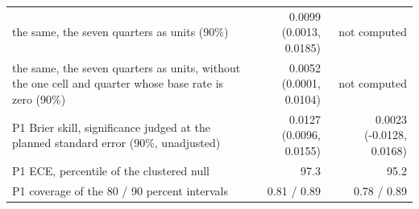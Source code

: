 \begin{tabular}{lrr}
the same, the seven quarters as units (90\%) & 0.0099 (0.0013, 0.0185) & not computed \\
the same, the seven quarters as units, without the one cell and quarter whose base rate is zero (90\%) & 0.0052 (0.0001, 0.0104) & not computed \\
P1 Brier skill, significance judged at the planned standard error (90\%, unadjusted) & 0.0127 (0.0096, 0.0155) & 0.0023 (-0.0128, 0.0168) \\
P1 ECE, percentile of the clustered null & 97.3 & 95.2 \\
P1 coverage of the 80 / 90 percent intervals & 0.81 / 0.89 & 0.78 / 0.89 \\

\end{tabular}
